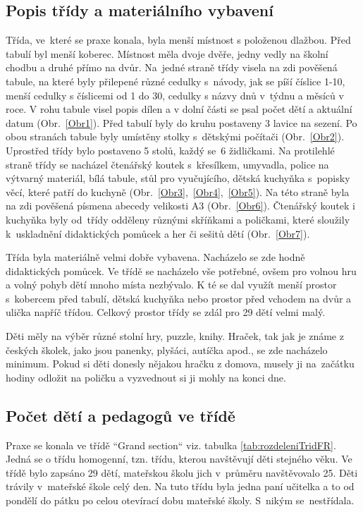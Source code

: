 		\subsection{Popis třídy a materiálního vybavení}
		\label{tridaVybaveni}
			Třída, ve které se praxe konala, byla menší místnost s položenou dlažbou. Před tabulí byl menší koberec. Místnost měla dvoje dvěře, jedny vedly na školní chodbu a druhé přímo na dvůr.
			Na jedné straně třídy visela na zdi pověšená tabule, na které byly přilepené různé cedulky s návody, jak se píší číslice 1-10, menší cedulky s číslicemi od 1 do 30, cedulky s názvy dnů v týdnu a měsíců v roce. V rohu tabule visel popis dílen a v dolní části se psal počet dětí a aktuální datum (Obr.~\ref{Obr1}). Před tabulí byly do kruhu postaveny 3 lavice na sezení. Po obou stranách tabule byly umístěny stolky s dětskými počítači (Obr.~\ref{Obr2}). Uprostřed třídy bylo postaveno 5 stolů, každý se 6 židličkami. Na protilehlé straně třídy se nacházel čtenářský koutek s křesílkem, umyvadla, police na výtvarný materiál, bílá tabule, stůl pro vyučujícího, dětská kuchyňka s popisky věcí, které patří do kuchyně (Obr.~\ref{Obr3},~\ref{Obr4},~\ref{Obr5}). Na této straně byla na zdi pověšená písmena abecedy velikosti A3 (Obr.~\ref{Obr6}). Čtenářský koutek i kuchyňka byly od třídy odděleny různými skříňkami a poličkami, které sloužily k uskladnění didaktických pomůcek a her či sešitů dětí (Obr.~\ref{Obr7}).

			Třída byla materiálně velmi dobře vybavena. Nacházelo se zde hodně didaktických pomůcek. Ve třídě se nacházelo vše potřebné, ovšem pro volnou hru a volný pohyb dětí mnoho místa nezbývalo. K té se dal využít menší prostor s kobercem před tabulí, dětská kuchyňka nebo prostor před vchodem na dvůr a ulička napříč třídou. Celkový prostor třídy se zdál pro 29 dětí velmi malý.

			Děti měly na výběr různé stolní hry, puzzle, knihy. Hraček, tak jak je známe z českých školek, jako jsou panenky, plyšáci, autíčka apod., se zde nacházelo minimum. Pokud si děti donesly nějakou hračku z domova, musely ji na začátku hodiny odložit na poličku a vyzvednout si ji mohly na konci dne. 

		\subsection{Počet dětí a pedagogů ve třídě}
		\label{trida}

			Praxe se konala ve třídě “Grand section“ viz. tabulka \ref{tab:rozdeleniTridFR}. Jedná se o třídu homogenní, tzn. třídu, kterou navštěvují děti stejného věku. Ve třídě bylo zapsáno 29 dětí, mateřskou školu jich v průměru navštěvovalo 25. Děti trávily v mateřské škole celý den. Na tuto třídu byla jedna paní učitelka a to od pondělí do pátku po celou otevírací dobu mateřské školy. S nikým se nestřídala. 

